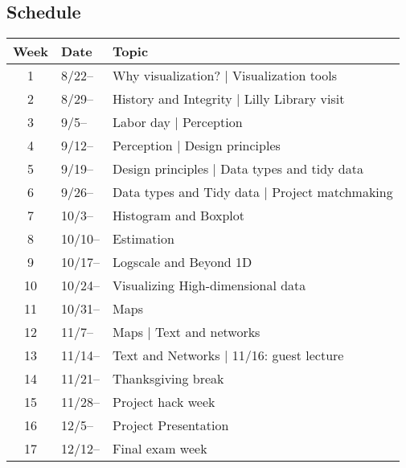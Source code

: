 \subsection{Schedule}\label{sub:schedule}%

\begin{tabular}{@{}cll@{}} \toprule
  Week & Date & Topic \\\midrule
  1 & 8/22-- & Why visualization? | Visualization tools \\
  2 & 8/29-- & History and Integrity | Lilly Library visit \\
  3 & 9/5--  & Labor day | Perception \\
  4 & 9/12--  & Perception | Design principles \\
  5 & 9/19--  & Design principles | Data types and tidy data \\
  6 & 9/26--  & Data types and Tidy data | Project matchmaking \\
  7 & 10/3--  &  Histogram and Boxplot  \\
  8 & 10/10--  & Estimation \\
  9 & 10/17--  &  Logscale and Beyond 1D \\
  10 & 10/24--  & Visualizing High-dimensional data \\
  11 & 10/31--  & Maps \\
  12 & 11/7--  & Maps | Text and networks \\
  13 & 11/14--  & Text and Networks | 11/16: guest lecture \\
  14 & 11/21--  & Thanksgiving break \\
  15 & 11/28--  & Project hack week \\
  16 & 12/5--  & Project Presentation \\
  17 & 12/12--  & Final exam week \\
  \bottomrule
\end{tabular}

